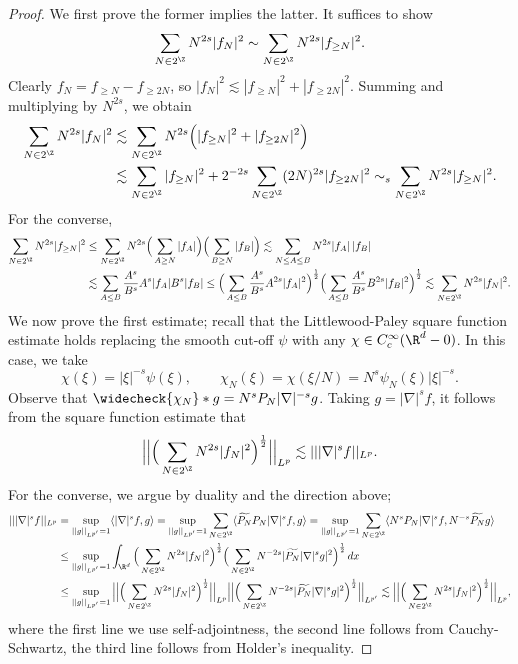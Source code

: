 \documentclass[reqno]{amsart}
\theoremstyle{definition}
\theoremstyle{remark}
\begin{document}
\begin{proof}
	We first prove the former implies the latter. It suffices to show 
		\[ \sum_{N \in 2^\Z} N^{2s} |f_N|^2 \sim \sum_{N \in 2^\Z} N^{2s} |f_{\geq N}|^2. \]
	Clearly $f_N = f_{\geq N} - f_{\geq 2N}$, so $|f_N|^2 \lesssim |f_{\geq N}|^2 + |f_{\geq 2N}|^2$.	Summing and multiplying by $N^{2s}$, we obtain
		\begin{align*}
			 \sum_{N \in 2^\Z} N^{2s} |f_N|^2 
			 	&\lesssim \sum_{N \in 2^\Z} N^{2s} \Big( |f_{\geq N}|^2 + |f_{\geq 2N}|^2 \Big) \\
			 	&\lesssim \sum_{N \in 2^\Z} |f_{\geq N}|^2 + 2^{-2s} \sum_{N \in 2^\Z} (2N)^{2s} |f_{\geq 2N}|^2  \sim_s \sum_{N \in 2^\Z} N^{2s} |f_{\geq N}|^2.
		\end{align*}
	For the converse, 
		\begin{align*}
			\sum_{N \in 2^\Z} N^{2s} |f_{\geq N}|^2
				&\leq  \sum_{N \in 2^\Z} N^{2s} \Big(\sum_{A \geq N} |f_A|\Big) \Big( \sum_{B \geq N} |f_B|\Big) \lesssim \sum_{N \leq A \leq B} N^{2s} |f_A| \, |f_B| \\
				&\lesssim \sum_{A \leq B} \frac{A^s}{B^s} A^s |f_A| B^s |f_B| \leq \Big( \sum_{A \leq B} \frac{A^s}{B^s} A^{2s} |f_A|^2 \Big)^\frac12 \Big( \sum_{A \leq B} \frac{A^s}{B^s} B^{2s} |f_B|^2 \Big)^\frac12 \lesssim \sum_{N \in 2^\Z} N^{2s} |f_N|^2.
		\end{align*}	 	
	We now prove the first estimate; recall that the Littlewood-Paley square function estimate holds replacing the smooth cut-off $\psi$ with any $\chi \in C^\infty_c (\R^d - 0)$. In this case, we take
		\[ \chi (\xi) = |\xi|^{-s} \psi(\xi), \qquad \chi_N (\xi) = \chi(\xi/N) = N^s \psi_N (\xi) |\xi|^{-s}. \]
	Observe that $\widecheck{\chi_N} * g = N^s P_N |\nabla|^{-s} g$. Taking $g = |\nabla|^s f$, it follows from the square function estimate that
		\[ \Big|\Big| \Big( \sum_{N \in 2^\Z} N^{2s} |f_N|^2 \Big)^\frac12 \Big|\Big|_{L^p} \lesssim |||\nabla|^s f||_{L^p}. \]	
	For the converse, we argue by duality and the direction above;
	\begin{align*}
		|||\nabla|^s f||_{L^p}
			&= \sup_{||g||_{L^{p'}} = 1} \langle |\nabla|^s f, g \rangle = \sup_{||g||_{L^{p'}} = 1} \sum_{N \in 2^\Z} \langle \widetilde{P_N} P_N |\nabla|^s f, g \rangle = \sup_{||g||_{L^{p'}} = 1} \sum_{N \in 2^\Z} \langle N^s P_N |\nabla|^s f,  N^{-s} \widetilde{P_N} g \rangle \\
			&\leq  \sup_{||g||_{L^{p'}} = 1} \int_{\R^d} \Big( \sum_{N \in 2^\Z} N^{2s} |f_N|^2 \Big)^{\frac12} \Big( \sum_{N \in 2^\Z} N^{-2s} |\widetilde{P_N} |\nabla|^s g|^2 \Big)^{\frac12} \, dx \\
			&\leq  \sup_{||g||_{L^{p'}} = 1} \Big| \Big| \Big( \sum_{N \in 2^\Z} N^{2s} |f_N|^2 \Big)^{\frac12}\Big|\Big|_{L^p} \Big| \Big|  \Big( \sum_{N \in 2^\Z} N^{-2s} |\widetilde{P_N} |\nabla|^s g|^2 \Big)^{\frac12} \Big|\Big|_{L^{p'}} \lesssim  \Big| \Big| \Big( \sum_{N \in 2^\Z} N^{2s} |f_N|^2 \Big)^{\frac12}\Big|\Big|_{L^p},
	\end{align*}
	where the first line we use self-adjointness, the second line follows from Cauchy-Schwartz, the third line follows from Holder's inequality. 
\end{proof}	
\end{document}
